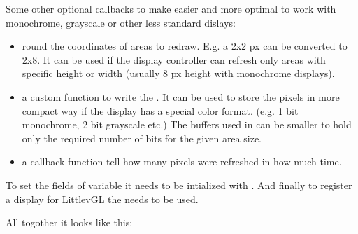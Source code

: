 \documentclass[letterpaper,10pt,english]{sphinxmanual}
\begin{document}
Some other optional callbacks to make easier and more optimal to work with monochrome, grayscale or other less standard dislays:
\begin{itemize}
\item {} 
 round the coordinates of areas to redraw. E.g. a 2x2 px can be converted to 2x8.
It can be used if the display controller can refresh only areas with specific height or width (usually 8 px height with monochrome displays).

\item {} 
 a custom function to write the .
It can be used to store the pixels in more compact way if the display has a special color format. (e.g. 1 bit monochrome, 2  bit grayscale etc.)
The buffers used in  can be smaller to hold only the required number of bits for the given area size.

\item {} 
 a callback function tell how many pixels were refreshed in how much time.

\end{itemize}

To set the fields of  variable it needs to be intialized with .
And finally to register a display for LittlevGL the  needs to be used.

All togother it looks like this:

%
\begin{sphinxVerbatim}[commandchars=\\\{\}]
                      
                
                  
              
      
       
\end{sphinxVerbatim}
\end{document}
